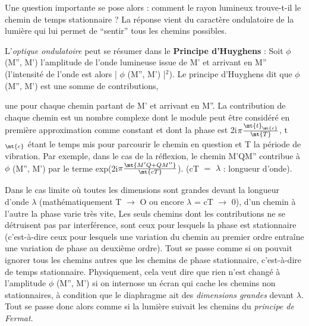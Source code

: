 Une question importante se pose alors : comment le rayon
lumineux trouve-t-il le chemin de temps stationnaire ? La réponse vient
du caractère ondulatoire de la lumière qui lui permet de “sentir” tous
les chemins possibles.

L'{\it optique ondulatoire} peut se résumer dans le {\bf Principe
d'Huyghens} : Soit $\phi$ (M'', M') l'amplitude de l'onde lumineuse issue de
M' et arrivant en M'' (l'intensité de l'onde est alors | $\phi$ (M'', M') |$^2$).
Le principe d'Huyghens dit que $\phi$ (M'', M') est une somme de contributions,
\begin{center}  \end{center}
une pour chaque chemin partant de M' et arrivant en M''. La contribution
de chaque chemin est un nombre complexe dont le module peut être considéré
en première approximation comme constant et dont la phase est
2i$\pi \frac{\mt{t}_\mt{c}}{\mt{T}}$, t$_\mt{c}$ étant le temps mis pour parcourir le chemin en question
et T la période de vibration. Par exemple, dans le cas de la réflexion, le chemin M'QM'' contribue à
$\phi$ (M'', M') par le terme exp(2i$\pi \frac{\mt{M'Q + QM''}}{\mt{cT}}$). (cT $=$ $\lambda$ : longueur d'onde).

Dans le cas limite où toutes les dimensions sont grandes devant
la longueur d'onde $\lambda$ (mathématiquement T $\to$ O ou encore $\lambda$ = cT $\to$ 0), d'un
chemin à l'autre la phase varie très vite, Les seuls chemins dont les
contributions ne se détruisent pas par interférence, sont ceux pour lesquels la phase est stationnaire
(c'est-à-dire ceux pour lesquels une variation du chemin au premier ordre entraîne une variation de phase
au deuxième ordre). Tout se passe comme si on pouvait ignorer tous les chemins autres que les chemins de
phase stationnaire, c'est-à-dire de temps
stationnaire. Physiquement, cela veut dire que rien n'est changé à l'amplitude  $\phi$ (M'', M')
si on internose
un écran qui cache les chemins non
stationnaires, à condition que le diaphragme ait des {\it dimensions grandes}
devant $\lambda$. Tout se passe donc alors comme si la lumière suivait les chemins du {\it principe de Fermat}.

